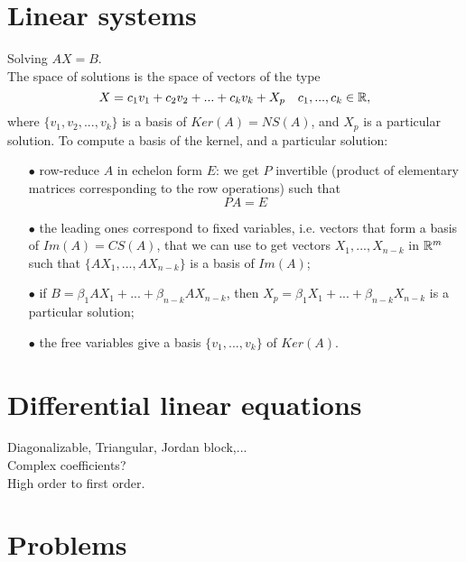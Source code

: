 \section{Linear systems}

Solving $AX = B$.\\

The space of solutions is the space of vectors of the type
\[X= c_1 v_1 + c_2 v_2 + ... + c_k v_k + X_p \quad c_1,...,c_k \in \mathbb R,\]
where $\{ v_1, v_2,...,v_k\}$ is a basis of $Ker(A)= NS(A)$, and $X_p$ is a particular solution. To compute a basis of the kernel, and a particular solution:
\begin{itemize}
\item[$\bullet$] row-reduce $A$ in echelon form $E$: we get $P$ invertible (product of elementary matrices corresponding to the row operations) such that \[PA = E\]
\item[$\bullet$] the leading ones correspond to fixed variables, i.e. vectors that form a basis of $Im(A)= CS(A)$, that we can use to get vectors $X_1,...,X_{n-k}$ in $\mathbb R^m$ such that $\{AX_1,...,AX_{n-k}\}$ is a basis of $Im(A)$;
\item[$\bullet$] if $B = \beta_1 A X_1 + ... + \beta_{n-k} A X_{n-k}$, then $X_p = \beta_1 X_1 + ... + \beta_{n-k} X_{n-k}$ is a particular solution;
\item[$\bullet$] the free variables give a basis $\{v_1, ... ,v_k\}$ of $Ker(A)$.    
\end{itemize}

\section{Differential linear equations}

Diagonalizable, Triangular, Jordan block,...\\

Complex coefficients?\\

High order to first order.\\

\section{Problems}

